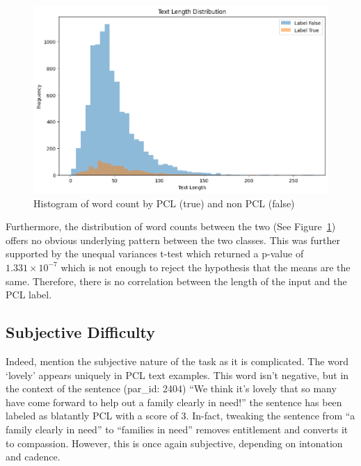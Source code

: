 \documentclass[11pt,a4paper]{article}
\begin{document}
\begin{figure}[H]
    \centering
    \includegraphics[trim=0cm 0cm 0cm .8cm, clip, width=\linewidth]{figures/text-input-length-by-binary-patronizing.png}
    \caption{Histogram of word count by PCL (true) and non PCL (false)\footnotemark}
    \label{fig:word-count}
\end{figure}


Furthermore, the distribution of word counts between the two (See Figure~\ref{fig:word-count}) offers no obvious underlying pattern between the two classes. This was further supported by the unequal variances t-test which returned a p-value of $1.331 \times 10^{-7}$ which is not enough to reject the hypothesis that the means are the same. Therefore, there is no correlation between the length of the input and the PCL label.


\subsection{Subjective Difficulty}

Indeed, \citet{perez-almendros-etal-2020-dont} mention the subjective nature of the task as it is complicated. The word `lovely' appears uniquely in PCL text examples. This word isn't negative, but in the context of the sentence (par\_id: 2404) ``We think it's lovely that so many have come forward to help out a family clearly in need!'' the sentence has been labeled as blatantly PCL with a score of 3. In-fact, tweaking the sentence from ``a family clearly in need'' to ``families in need'' removes entitlement and converts it to compassion. However, this is once again subjective, depending on intonation and cadence.
\end{document}
